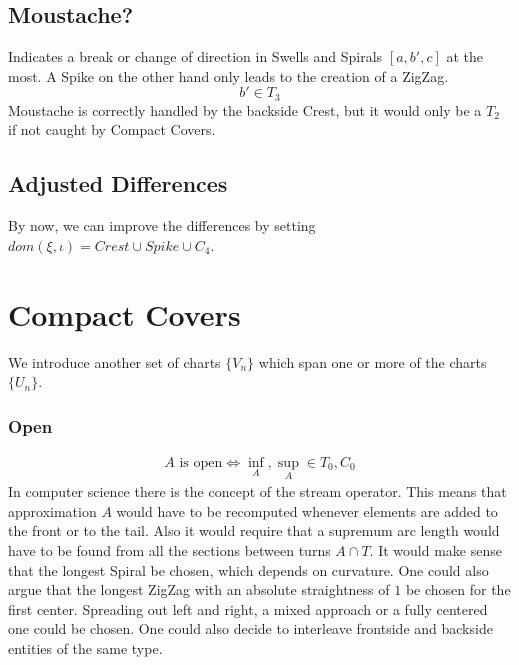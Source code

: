\documentclass{report}
\begin{document}
\subsection{Moustache?}
Indicates a break or change of direction in Swells and Spirals $[a,b',c]$ at the most. A Spike on the other hand only leads to the creation of a ZigZag.
\begin{equation}
b' \in T_{3}
\end{equation}
Moustache is correctly handled by the backside Crest, but it would only be a $T_{2}$ if not caught by Compact Covers.

\subsection*{Adjusted Differences}
By now, we can improve the differences by setting $dom(\xi,\iota)=Crest \cup Spike \cup C_{4}$.

\section{Compact Covers}
We introduce another set of charts $\{V_{n}\}$ which span one or more of the charts $\{U_{n}\}$.
\subsubsection*{Open}
\begin{align}
A \text{ is open} \Leftrightarrow \inf_{A},\sup_{A}\in T_{0},C_{0}
\end{align}
In computer science there is the concept of the stream operator. This means that approximation $A$ would have to be recomputed whenever elements are added to the front or to the tail. Also it would require that a supremum arc length would have to be found from all the sections between turns $A \cap T$. It would make sense that the longest Spiral be chosen, which depends on curvature. One could also argue that the longest ZigZag with an absolute straightness of $1$ be chosen for the first center. Spreading out left and right, a mixed approach or a fully centered one could be chosen. One could also decide to interleave frontside and backside entities of the same type.
\end{document}
